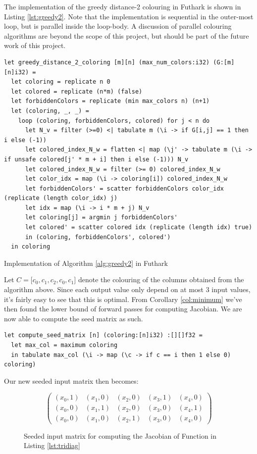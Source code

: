 	The implementation of the greedy distance-2 colouring in Futhark is shown in
	Listing \ref{lst:greedy2}. Note that the implementation is sequential in the
	outer-most loop, but is parallel inside the loop-body.
	A  discussion of parallel colouring algorithms are beyond the scope of this
	project, but should be part of the future work of this project.
\begin{listing}[H]
\begin{verbatim}
let greedy_distance_2_coloring [m][n] (max_num_colors:i32) (G:[m][n]i32) =
  let coloring = replicate n 0
  let colored = replicate (n*m) (false)
  let forbiddenColors = replicate (min max_colors n) (n+1)
  let (coloring, _, _) =
    loop (coloring, forbiddenColors, colored) for j < n do
      let N_v = filter (>=0) <| tabulate m (\i -> if G[i,j] == 1 then i else (-1))
      let colored_index_N_w = flatten <| map (\j' -> tabulate m (\i -> if unsafe colored[j' * m + i] then i else (-1))) N_v
      let colored_index_N_w = filter (>= 0) colored_index_N_w
      let color_idx = map (\i -> coloring[i]) colored_index_N_w
      let forbiddenColors' = scatter forbiddenColors color_idx (replicate (length color_idx) j)
      let idx = map (\i -> i * m + j) N_v
      let coloring[j] = argmin j forbiddenColors'
      let colored' = scatter colored idx (replicate (length idx) true)
      in (coloring, forbiddenColors', colored')
  in coloring
\end{verbatim}
\caption{Implementation of Algorithm \ref{alg:greedy2} in Futhark}
\label{lst:greedy2}
\end{listing}
	Let $C = \lbrack c_0, c_1, c_2, c_0, c_1 \rbrack$ denote the
	colouring of the columns obtained from the algorithm above.
	Since each output value only depend on at most 
	3 input values, it's fairly easy to see that this is optimal. From Corollary \ref{col:minimum}
	we've then found the lower bound of forward passes for computing Jacobian.  
	We are now able to compute the  seed matrix as such.
\begin{listing}[H]
\begin{verbatim}
let compute_seed_matrix [n] (coloring:[n]i32) :[][]f32 =
  let max_col = maximum coloring
  in tabulate max_col (\i -> map (\c -> if c == i then 1 else 0) coloring)
\end{verbatim}
\end{listing}
Our new seeded input matrix then becomes:
\begin{figure}[H]
	$$ \left(\begin{matrix}
	(x_0, 1) & (x_1, 0) & (x_2, 0) & (x_3, 1) & (x_4, 0) \\
	(x_0, 0) & (x_1, 1) & (x_2, 0) & (x_3, 0) & (x_4, 1) \\
	(x_0, 0) & (x_1, 0) & (x_2, 1) & (x_3, 0) & (x_4, 0)
	\end{matrix}\right) $$
	\caption{Seeded input matrix for computing the Jacobian of Function in Listing \ref{lst:tridiag}}
\end{figure}
